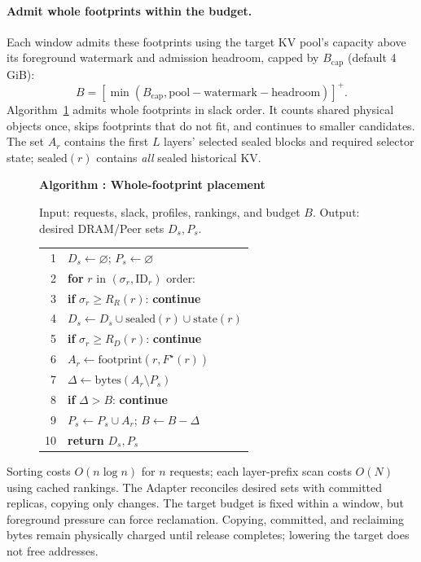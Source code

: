 \paragraph{Admit whole footprints within the budget.}

Each window admits these footprints using the target KV pool's capacity above
its foreground watermark and admission headroom, capped by
$B_{\mathrm{cap}}$ (default 4\,GiB):
\begin{equation}
 B=[\min(B_{\mathrm{cap}},\mathrm{pool}-\mathrm{watermark}
                         -\mathrm{headroom})]^+.
 \label{eq:peer-budget}
\end{equation}
Algorithm~\ref{alg:placement} admits whole footprints in slack order.
It counts shared physical objects once, skips footprints that do not
fit, and continues to smaller candidates. The set $A_r$ contains the
first $L$ layers' selected sealed blocks and required selector state;
$\mathrm{sealed}(r)$ contains \emph{all} sealed historical KV.

\begin{figure}[t]
  \label{alg:placement}
  \noindent\textbf{Algorithm \thedesignalgorithm: Whole-footprint placement}
  \par\smallskip
  \noindent Input: requests, slack, profiles, rankings, and budget $B$.
  Output: desired DRAM/Peer sets $D_s,P_s$.
  \par\smallskip
  \begin{tabularx}{\columnwidth}{@{}r@{\quad}X@{}}
    \toprule
    1 & $D_s\gets\varnothing$; $P_s\gets\varnothing$ \\
    2 & \textbf{for} $r$ in $(\sigma_r,\mathrm{ID}_r)$ order: \\
    3 & \quad\textbf{if} $\sigma_r\ge R_R(r)$: \textbf{continue} \\
    4 & \quad$D_s\gets D_s\cup\mathrm{sealed}(r)\cup\mathrm{state}(r)$ \\
    5 & \quad\textbf{if} $\sigma_r\ge R_D(r)$: \textbf{continue} \\
    6 & \quad$A_r\gets\mathrm{footprint}(r,F^\star(r))$ \\
    7 & \quad$\Delta\gets\mathrm{bytes}(A_r\setminus P_s)$ \\
    8 & \quad\textbf{if} $\Delta>B$: \textbf{continue} \\
    9 & \quad$P_s\gets P_s\cup A_r$; $B\gets B-\Delta$ \\
   10 & \textbf{return} $D_s,P_s$ \\
    \bottomrule
  \end{tabularx}
\end{figure}

Sorting costs $O(n\log n)$ for $n$ requests; each layer-prefix scan costs
$O(N)$ using cached rankings. The Adapter reconciles desired sets with
committed replicas, copying only changes. The target budget is fixed
within a window, but foreground pressure can force reclamation.
Copying, committed, and reclaiming bytes remain physically charged
until release completes; lowering the target does not free addresses.
